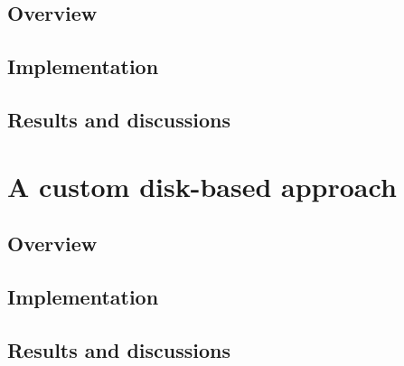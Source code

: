 \subsection{Overview}


\subsection{Implementation}


\subsection{Results and discussions}



\section{A custom disk-based approach}


\subsection{Overview}


\subsection{Implementation}


\subsection{Results and discussions}
